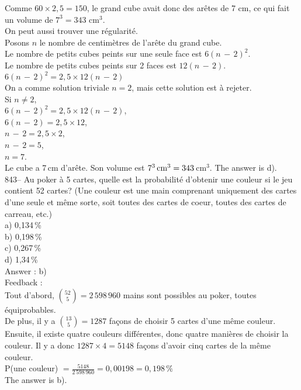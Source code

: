 \documentclass[letterpaper, 12pt]{article}
\begin{document}
Comme $60\times2,5=150$, le grand cube avait donc des ar\^etes de 7
cm, ce qui fait un volume de $7^3 = 343$ cm${^3}$.\\

On peut aussi trouver une r\'egularit\'e.\\
Posons $n$ le nombre de centim\`etres de l'ar\^ete du grand cube.\\
Le nombre de petits cubes peints sur une seule face est $6\left(
n\,-\,2\right) ^{2}$.\\
Le nombre de petits cubes peints sur 2 faces est $12\left( n\,-\,2\right)
$.\\

$6\left( n\,-\,2\right) ^{2}=2,5\times12\left( n\,-\,2\right) $\\
On a comme solution triviale $n=2$, mais cette solution est \`a rejeter.\\

Si $n\neq2$,\\
$6\left( n\,-\,2\right) ^{2}=2,5\times12\left( n\,-\,2\right) $,\\
$6\left( n\,-\,2\right)=2,5\times12 $,\\
$ n\,-\,2=2,5\times2 $,\\
$ n\,-\,2=5 $,\\
$ n=7 $.\\
Le cube a 7\,cm d'ar\^ete.  Son volume est
$7^3\textrm{\,cm}^{3}=343$\,cm$^{3}$.  The answer is d).\\

843-- Au poker \`a 5 cartes, quelle est la probabilit\'e d'obtenir une
couleur si le jeu contient 52 cartes? (Une couleur est une main comprenant
uniquement des cartes d'une seule et m\^eme sorte, soit toutes des cartes de
coeur, toutes des cartes de carreau, etc.) \\
a) 0,134\,\%\\
b) 0,198\,\%\\
c) 0,267\,\%\\
d) 1,34\,\%\\

Answer : b)\\

Feedback : \\
Tout d'abord, $\binom{52}{5}=2\,598\,960$ mains sont possibles au poker,
toutes \'equiprobables.  \\[2mm]
De plus, il y a $\binom{13}{5}=1287$ fa\c cons de choisir 5 cartes d'une
m\^eme couleur.  Ensuite, il existe quatre couleurs diff\'erentes, donc
quatre mani\`eres de choisir la couleur.  Il y a donc $1287\times4=5148$
fa\c cons d'avoir cinq cartes de la m\^eme couleur.  \\[2mm]
P(une couleur) $=\frac{5148}{2\,598\,960}=0,00198=0,198\,\%$\\[2mm]
The answer is b).\\
\end{document}
